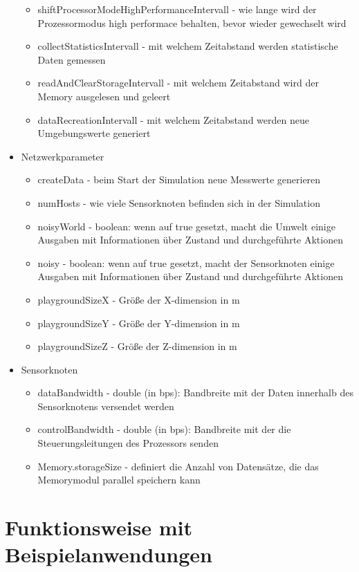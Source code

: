 \begin{itemize}
\begin{itemize}
\item shiftProcessorModeHighPerformanceIntervall - wie lange wird der Prozessormodus high performace behalten, bevor wieder gewechselt wird
\item collectStatisticsIntervall - mit welchem Zeitabstand werden statistische Daten gemessen
\item readAndClearStorageIntervall - mit welchem Zeitabstand wird der Memory ausgelesen und geleert
\item dataRecreationIntervall - mit welchem Zeitabstand werden neue Umgebungswerte generiert
\end{itemize}
\item Netzwerkparameter
\begin{itemize}
\item createData - beim Start der Simulation neue Messwerte generieren
\item numHosts - wie viele Sensorknoten befinden sich in der Simulation
\item noisyWorld - boolean: wenn auf true gesetzt, macht die Umwelt einige Ausgaben mit Informationen über Zustand und durchgeführte Aktionen
\item noisy - boolean: wenn auf true gesetzt, macht der Sensorknoten einige Ausgaben mit Informationen über Zustand und durchgeführte Aktionen
\item playgroundSizeX - Größe der X-dimension in m
\item playgroundSizeY - Größe der Y-dimension in m
\item playgroundSizeZ - Größe der Z-dimension in m
\end{itemize}
\item Sensorknoten
\begin{itemize}
\item dataBandwidth - double (in bps): Bandbreite mit der Daten innerhalb des Sensorknotens versendet werden
\item controlBandwidth - double (in bps): Bandbreite mit der die Steuerungsleitungen des Prozessors senden
\item Memory.storageSize - definiert die Anzahl von Datensätze, die das Memorymodul parallel speichern kann
\end{itemize}
\end{itemize}

\section{Funktionsweise mit Beispielanwendungen}

